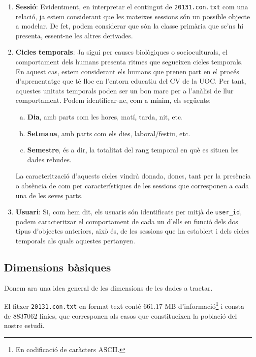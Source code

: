 \documentclass[
	a4paper,
	twoside,
	justified
]{tufte-book}
\begin{document}
\begin{enumerate}[(1)]

\item \textbf{Sessió}: Evidentment, en interpretar el contingut de \texttt{20131.con.txt} com una relació, ja estem considerant que les mateixes sessions són un possible objecte a modelar. De fet, podem considerar que són la classe primària que se'ns hi presenta, essent-ne les altres derivades.

\item \textbf{Cicles temporals}: Ja sigui per causes biològiques o socioculturals, el comportament dels humans presenta ritmes que segueixen cicles temporals. En aquest cas, estem considerant els humans que prenen part en el procés d'aprenentatge que té lloc en l'entorn educatiu del CV de la UOC. Per tant, aquestes unitats temporals poden ser un bon marc per a l'anàlisi de llur comportament. Podem identificar-ne, com a mínim, els següents:

	\begin{enumerate}[(a)]
	\item \textbf{Dia}, amb parts com les hores, matí, tarda, nit, etc. 
	\item \textbf{Setmana}, amb parts com els dies, laboral/festiu, etc.
	\item \textbf{Semestre}, és a dir, la totalitat del rang temporal en què es situen les dades rebudes. 
	\end{enumerate}
	
La caracterització d'aquests cicles vindrà donada, doncs, tant per la presència o absència de com per característiques de les sessions que corresponen a cada una de les seves parts.  

\item \textbf{Usuari}: Si, com hem dit, els usuaris són identificats per mitjà de \texttt{user\_id}, podem caracteritzar el comportament de cada un d'ells en funció dels dos tipus d'objectes anteriors, això és, de les sessions que ha establert i dels cicles temporals als quals aquestes pertanyen. 
 
\end{enumerate}

\subsection{Dimensions bàsiques}

Donem ara una idea general de les dimensions de les dades a tractar.  

El fitxer \texttt{20131.con.txt} en format text conté $661.17$ MB d'informació\footnote{En codificació de caràcters ASCII.} i consta de $8837062$ línies, que corresponen als casos que constitueixen la població del nostre estudi. 
\end{document}
